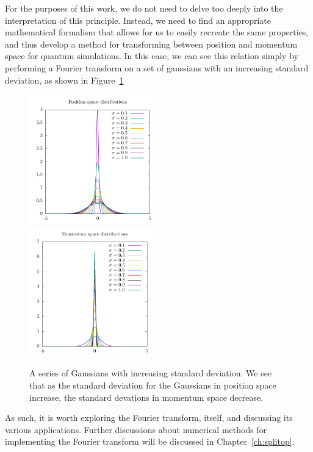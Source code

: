 For the purposes of this work, we do not need to delve too deeply into the interpretation of this principle.
Instead, we need to find an appropriate mathematical formalism that allows for us to easily recreate the same properties, and thus develop a method for transforming between position and momentum space for quantum simulations.
In this case, we can see this relation simply by performing a Fourier transform on a set of gaussians with an increasing standard deviation, as shown in Figure~\ref{fig:uncertain}

\begin{figure}

\includegraphics[width = 0.5\textwidth]{data/qs/Heisenberg/position.pdf}
\includegraphics[width = 0.5\textwidth]{data/qs/Heisenberg/momentum.pdf}

\caption{A series of Gaussians with increasing standard deviation. We see that as the standard deviation for the Gaussians in position space increase, the standard devations in momentum space decrease.}
\label{fig:uncertain}
\end{figure}


As such, it is worth exploring the Fourier transform, itself, and discussing its various applications.
Further discussions about numerical methods for implementing the Fourier transform will be discussed in Chapter~\ref{ch:splitop}.

